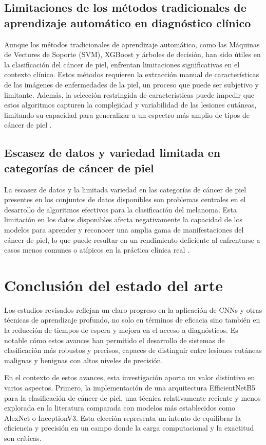 \subsection{Limitaciones de los métodos tradicionales de aprendizaje automático en diagnóstico clínico}
Aunque los métodos tradicionales de aprendizaje automático, como las Máquinas de Vectores de Soporte (SVM), XGBoost y árboles de decisión, han sido útiles en la clasificación del cáncer de piel, enfrentan limitaciones significativas en el contexto clínico. Estos métodos requieren la extracción manual de características de las imágenes de enfermedades de la piel, un proceso que puede ser subjetivo y limitante. Además, la selección restringida de características puede impedir que estos algoritmos capturen la complejidad y variabilidad de las lesiones cutáneas, limitando su capacidad para generalizar a un espectro más amplio de tipos de cáncer de piel .

\subsection{Escasez de datos y variedad limitada en categorías de cáncer de piel}
La escasez de datos y la limitada variedad en las categorías de cáncer de piel presentes en los conjuntos de datos disponibles son problemas centrales en el desarrollo de algoritmos efectivos para la clasificación del melanoma. Esta limitación en los datos disponibles afecta negativamente la capacidad de los modelos para aprender y reconocer una amplia gama de manifestaciones del cáncer de piel, lo que puede resultar en un rendimiento deficiente al enfrentarse a casos menos comunes o atípicos en la práctica clínica real .

\section{Conclusión del estado del arte}

Los estudios revisados reflejan un claro progreso en la aplicación de CNNs y otras técnicas de aprendizaje profundo, no solo en términos de eficacia sino también en la reducción de tiempos de espera y mejora en el acceso a diagnósticos. Es notable cómo estos avances han permitido el desarrollo de sistemas de clasificación más robustos y precisos, capaces de distinguir entre lesiones cutáneas malignas y benignas con altos niveles de precisión.

En el contexto de estos avances, esta investigación aporta un valor distintivo en varios aspectos. Primero, la implementación de una arquitectura EfficientNetB5 para la clasificación de cáncer de piel, una técnica relativamente reciente y menos explorada en la literatura comparada con modelos más establecidos como AlexNet o InceptionV3. Esta elección representa un intento de equilibrar la eficiencia y precisión en un campo donde la carga computacional y la exactitud son críticas.

